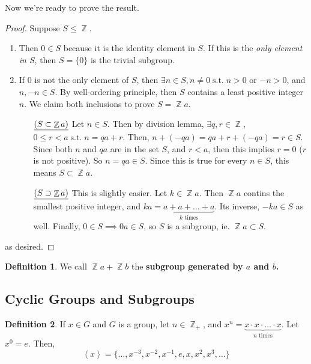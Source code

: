 \documentclass[11pt]{amsart} %
\theoremstyle{definition}
\newtheorem{definition}{Definition}[section]
\theoremstyle{definition}
\DeclareMathOperator{\Z}{\mathbb{Z}}
\DeclareMathOperator{\suchthat}{\text{ s.t. }}
\numberwithin{equation}{section}
\newcommand{\cyclic}[1]{\left\langle #1 \right\rangle}
\begin{document}
Now we're ready to prove the result.

\begin{proof}
	Suppose $S \leq \Z$.
	\begin{enumerate}[noitemsep]
		\item Then $0 \in S$ because it is the identity element in $S$. If this is the \textit{only element in $S$}, then $S= \{0\}$ is the trivial subgroup.
		\item If $0$ is not the only element of $S$, then $\exists n \in S, n \neq 0 \suchthat n>0$ or $-n>0$, and $n,-n \in S$. By well-ordering principle, then $S$ contains a least positive integer $n$. We claim both inclusions to prove $S=\Z a$.
		
		\begin{enumerate}
			\item[$\uline{(S \subset \Z a)}$] Let $n \in S$. Then by division lemma, $\exists q, r \in \Z$, $0 \leq r < a \suchthat n=qa+r$. Then, $n + (-qa) = qa +r + (-qa) = r \in S$. Since both $n$ and $qa$ are in the set $S$, and $r<a$, then this implies $r=0$ ($r$ is not positive). So $n = qa \in S$. Since this is true for every $n \in S$, this means $S \subset \Z a$.
		
			\item[$\uline{(S \supset\Z a )}$] This is slightly easier. Let $k \in \Z a$. Then $\Z a$ contins the smallest positive integer, and $ka = \underbrace{a+ a + \dots + a}_{k \text{ times}}$. Its inverse, $-ka \in S$ as well. Finally, $0 \in S \implies 0a \in S$, so $S$ is a subgroup, ie. $\Z a \subset S$.
		\end{enumerate}
	\end{enumerate}
as desired.
\end{proof}

\begin{definition}
	We call $\Z a + \Z b$ the \textbf{subgroup generated by $a$ and $b$.}
\end{definition}

\subsection{Cyclic Groups and Subgroups}

\begin{definition}
	If $x \in G$ and $G$ is a group, let $n \in \Z_+$, and $x^n = \underbrace{x \cdot x \cdot \dots \cdot x}_{n \text{ times}}$. Let $x^0 = e$. Then,
	$$ \cyclic{x} = \{ \dots , x^{-3}, x^{-2}, x^{-1}, e , x, x^2, x^3, \dots \} $$
\end{definition}
\end{document}
